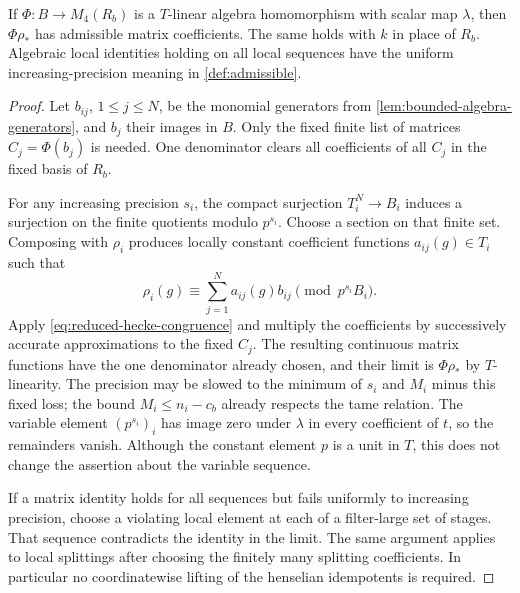 \begin{lemma}
\label{lem:finite-value-admissibility}
If $\Phi:B\to M_4(R_b)$ is a $T$-linear algebra homomorphism with
scalar map $\lambda$, then $\Phi\rho_*$ has admissible matrix
coefficients.  The same holds with $k$ in place of $R_b$.
Algebraic local identities holding on all local sequences have the
uniform increasing-precision meaning in \cref{def:admissible}.
\end{lemma}

\begin{proof}
Let $b_{ij}$, $1\leq j\leq N$, be the monomial generators from
\cref{lem:bounded-algebra-generators}, and $b_j$ their images in $B$.
Only the fixed finite list of matrices $C_j=\Phi(b_j)$ is needed.
One denominator clears all coefficients of all $C_j$ in the fixed
basis of $R_b$.

For any increasing precision $s_i$, the compact surjection
$T_i^N\to B_i$ induces a surjection on the finite quotients modulo
$p^{s_i}$.  Choose a section on that finite set.  Composing with
$\rho_i$ produces locally constant coefficient functions
$a_{ij}(g)\in T_i$ such that
\[
 \rho_i(g)\equiv\sum_{j=1}^N a_{ij}(g)b_{ij}
                       \pmod {p^{s_i}B_i}.
\]
Apply \cref{eq:reduced-hecke-congruence} and multiply the coefficients
by successively accurate approximations to the fixed $C_j$.
The resulting continuous matrix functions have the one denominator
already chosen, and their limit is $\Phi\rho_*$ by $T$-linearity.
The precision may be slowed to the minimum of $s_i$ and $M_i$ minus
this fixed loss; the bound $M_i\leq n_i-c_b$ already respects the
tame relation.  The variable element $(p^{s_i})_i$ has image zero
under $\lambda$ in every coefficient of $t$, so the remainders vanish.
Although the constant element $p$ is a unit in $T$, this does not
change the assertion about the variable sequence.

If a matrix identity holds for all sequences but fails uniformly to
increasing precision, choose a violating local element at each of
a filter-large set of stages.  That sequence contradicts the identity
in the limit.  The same argument applies to local splittings after
choosing the finitely many splitting coefficients.  In particular
no coordinatewise lifting of the henselian idempotents is required.
\end{proof}

